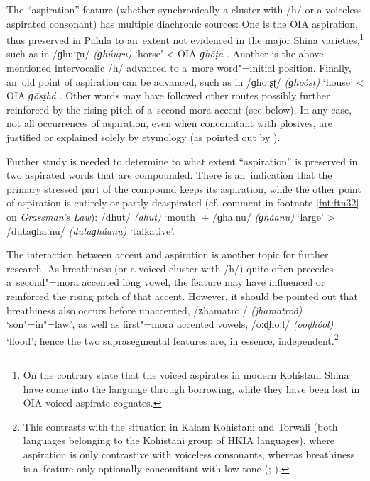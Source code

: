 The ``aspiration'' feature (whether synchronically a cluster with /h/ or a voiceless aspirated consonant) has multiple diachronic sources: One is the OIA aspiration, thus preserved in Palula to an~extent not evidenced in the major Shina varieties,\footnote{On the contrary \citet[30]{schmidtkohistani2008} state that the voiced aspirates in modern Kohistani Shina have come into the language through borrowing, while they have been lost in OIA voiced aspirate cognates.} such as in /ɡhuːɽu/ \textit{(ɡhúuṛu)} `horse' {\textless} OIA \textit{ɡhōṭa} \citep[4516]{turner1966}. Another is the above mentioned intervocalic /h/ advanced to a~more word"=initial position. Finally, an~old point of aspiration can be advanced, such as in /ɡhoːʂʈ/ \textit{(ɡhoóṣṭ)} `house' {\textless} OIA \textit{ɡōṣṭhá} \citep[4336]{turner1966}. Other words may have followed other routes possibly further reinforced by the rising pitch of a~second mora accent (see  below). In any case, not all occurrences of aspiration, even when concomitant with plosives, are justified or explained solely by etymology (as pointed out by \citealt[57]{morgenstierne1932}).


Further study is needed to determine to what extent ``aspiration'' is preserved in two aspirated words that are compounded. There is an~indication that the primary stressed part of the compound keeps its aspiration, while the other point of aspiration is entirely or partly deaspirated (cf. comment in footnote \ref{fnt:ftn32} on \textit{Grassman's Law}): /dhut/ \textit{(dhut)} `mouth' + /ɡhaːnu/ \textit{(ɡháanu)} `large' {\textgreater} /dutaɡhaːnu/ \textit{(dutaɡháanu)} `talkative'.


The interaction between accent and aspiration is another topic for further research. As breathiness (or a voiced cluster with /h/) quite often precedes a~second"=mora accented long vowel, the feature may have influenced or reinforced the rising pitch of that accent. However, it should be pointed out that breathiness also occurs before unaccented, /ʑhamatroː/ \textit{(ǰhamatroó)} `son"=in"=law', as well as first"=mora accented vowels, /oːɖhoːl/ \textit{(ooḍhóol)} `flood'; hence the two suprasegmental features are, in essence, independent.\footnote{This contrasts with the situation in Kalam Kohistani and Torwali (both languages belonging to the Kohistani group of HKIA languages), where aspiration is only contrastive with voiceless consonants, whereas breathiness is a~feature only optionally concomitant with low tone (\citealt[92]{baart1999b}; \citealt[36--37]{lunsford2001}). } 


